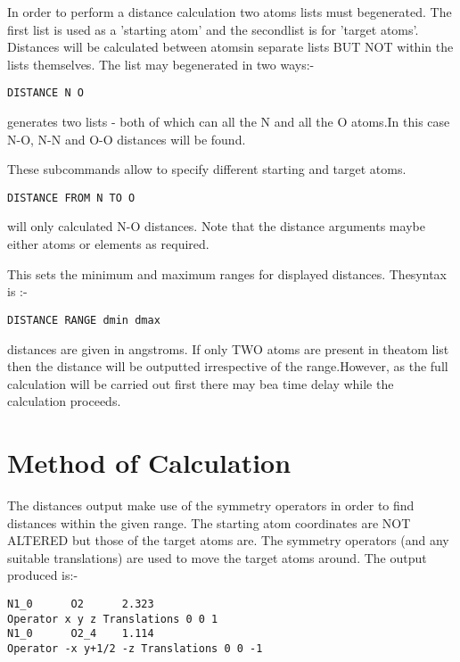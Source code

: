 \documentclass[10pt,a4paper]{report}
\begin{document}
\bigskip{}



In order to perform a distance calculation two atoms lists must begenerated. The first list is used as a 'starting atom' and the secondlist is for 'target atoms'. Distances will be calculated between atomsin separate lists BUT NOT within the lists themselves. The list may begenerated in two ways:-\small\begin{verbatim}DISTANCE N O\end{verbatim}\normalsize

generates two lists - both of which can all the N and all the O atoms.In this case N-O, N-N and O-O distances will be found.

\bigskip{}

\bigskip{}These subcommands allow to specify different starting and target atoms.\small\begin{verbatim}DISTANCE FROM N TO O\end{verbatim}\normalsize

will only calculated N-O distances. Note that the distance arguments maybe either atoms or elements as required.

\bigskip{}This sets the minimum and maximum ranges for displayed distances. Thesyntax is :-\small\begin{verbatim}DISTANCE RANGE dmin dmax\end{verbatim}\normalsize

distances are given in angstroms. If only TWO atoms are present in theatom list then the distance will be outputted irrespective of the range.However, as the full calculation will be carried out first there may bea time delay while the calculation proceeds.\section{Method of Calculation}


The distances output make use of the symmetry operators in order to
find distances within the given range. The starting atom coordinates are
NOT ALTERED but those of the target atoms are. The symmetry operators
(and any suitable translations) are used to move the target atoms
around. The output produced is:-

\small\begin{verbatim}
N1_0      O2      2.323
Operator x y z Translations 0 0 1
N1_0      O2_4    1.114
Operator -x y+1/2 -z Translations 0 0 -1
\end{verbatim}\normalsize
\end{document}
